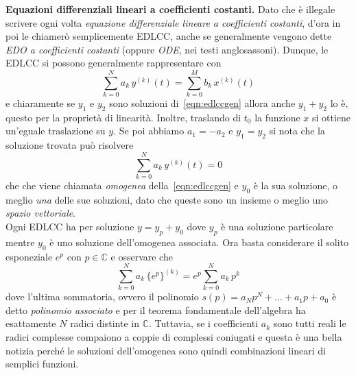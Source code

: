 \documentclass[a4paper,portrait,12pt]{article}
\theoremstyle{definition}
\begin{document}
\textbf{Equazioni differenziali lineari a coefficienti costanti.} Dato che è illegale scrivere ogni volta
\textit{equazione differenziale lineare a coefficienti costanti}, d'ora in poi le chiamerò semplicemente EDLCC,
anche se generalmente vengono dette \textit{EDO a coefficienti costanti} (oppure \textit{ODE}, nei testi
anglosassoni). Dunque, le EDLCC si possono generalmente rappresentare con
\begin{equation}
\label{eqn:edlccgen}
\sum_{k=0}^N a_k\,y^{(k)}(t) = \sum_{k=0}^M b_k\,x^{(k)} (t)
\end{equation}
e chiaramente se $y_1$ e $y_2$ sono soluzioni di~\eqref{eqn:edlccgen} allora anche $y_1 + y_2$ lo è, questo 
per la proprietà di linearità. Inoltre, traslando di $t_0$ la funzione $x$ si ottiene un'eguale traslazione 
su $y$. Se poi abbiamo $a_1 = -a_2$ e $y_1 = y_2$ si nota che la soluzione trovata può risolvere 
\begin{equation}
\label{eqn:edlccomo}
\sum_{k=0}^N a_k\,y^{(k)}(t) = 0
\end{equation}
che che viene chiamata \textit{omogenea} della~\eqref{eqn:edlccgen} e $y_0$ è la sua soluzione, o meglio 
\textit{una} delle sue soluzioni, dato che queste sono un insieme o meglio uno \textit{spazio vettoriale}.\\ 
Ogni EDLCC ha per soluzione $y = y_p + y_0$ dove $y_p$ è una soluzione particolare mentre $y_0$ è uno 
soluzione dell'omogenea associata. Ora basta considerare il solito esponeziale $e^p$ con $p \in \mathbb{C}$ 
e osservare che
\begin{equation}
\sum_{k=0}^N a_k\,\{e^p\}^{(k)} = e^p \sum_{k=0}^N a_k\,p^k
\end{equation}  
dove l'ultima sommatoria, ovvero il polinomio $s(p) = a_Np^N + ... + a_1p + a_0$ è detto \textit{polinomio 
associato} e per il teorema fondamentale dell'algebra ha esattamente $N$ radici distinte in $\mathbb{C}$.
Tuttavia, se i coefficienti $a_k$ sono tutti reali le radici complesse compaiono a coppie di 
complessi coniugati e questa è una bella notizia perché le soluzioni dell'omogenea sono quindi combinazioni
lineari di semplici funzioni.
\end{document}
